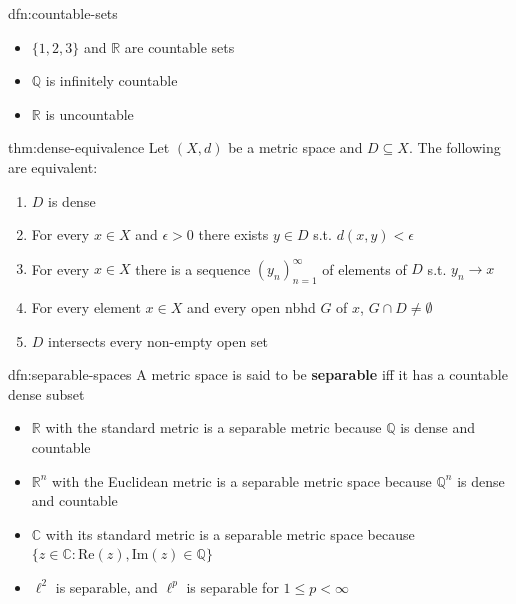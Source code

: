\documentclass[landscape, 8pt]{extarticle}
\begin{document}
\begin{multicols}{3}
\begin{dfn}{dfn:countable-sets}{}
    \begin{itemize}
        \item $\{1, 2, 3\}$ and $\mathbb{R}$ are countable sets
        \item $\mathbb{Q}$ is infinitely countable
        \item $\mathbb{R}$ is uncountable
    \end{itemize}
\end{dfn}

\begin{thm}{thm:dense-equivalence}{}
    Let $(X, d)$ be a metric space and $D \subseteq X$. The following are equivalent:
    \begin{enumerate}
        \item $D$ is dense
        \item For every $x\in X$ and $\epsilon > 0$ there exists $y\in D$ s.t. $d(x, y) < \epsilon$
        \item For every $x\in X$ there is a sequence $(y_{n})^{\infty}_{n = 1}$ of elements of $D$ s.t. $y_{n}\to x$
        \item For every element $x\in X$ and every open nbhd $G$ of $x$, $G \cap D \ne \emptyset$
        \item $D$ intersects every non-empty open set
    \end{enumerate}
\end{thm}

\begin{dfn}{dfn:separable-spaces}{}
    A metric space is said to be \textbf{separable} iff it has a countable dense subset

    \begin{itemize}
        \item $\mathbb{R}$ with the standard metric is a separable metric because $\mathbb{Q}$ is dense and countable
        \item $\mathbb{R}^{n}$ with the Euclidean metric is a separable metric space because $\mathbb{Q}^{n}$ is dense and countable
        \item $\mathbb{C}$ with its standard metric is a separable metric space because $\{ z\in\mathbb{C} : \text{Re}(z), \text{Im}(z)\in \mathbb{Q}\}$
        \item $\ell^{2}$ is separable, and $\ell^{p}$ is separable for $1 \le p < \infty$
    \end{itemize}
\end{dfn}


\end{multicols}
\end{document}
